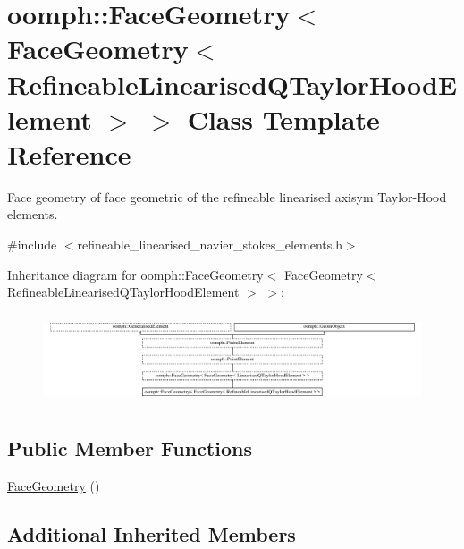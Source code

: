 \hypertarget{classoomph_1_1FaceGeometry_3_01FaceGeometry_3_01RefineableLinearisedQTaylorHoodElement_01_4_01_4}{}\section{oomph\+:\+:Face\+Geometry$<$ Face\+Geometry$<$ Refineable\+Linearised\+Q\+Taylor\+Hood\+Element $>$ $>$ Class Template Reference}
\label{classoomph_1_1FaceGeometry_3_01FaceGeometry_3_01RefineableLinearisedQTaylorHoodElement_01_4_01_4}


Face geometry of face geometric of the refineable linearised axisym Taylor-\/\+Hood elements.  




{\ttfamily \#include $<$refineable\+\_\+linearised\+\_\+navier\+\_\+stokes\+\_\+elements.\+h$>$}

Inheritance diagram for oomph\+:\+:Face\+Geometry$<$ Face\+Geometry$<$ Refineable\+Linearised\+Q\+Taylor\+Hood\+Element $>$ $>$\+:\begin{figure}[H]
\begin{center}
\leavevmode
\includegraphics[height=2.713178cm]{classoomph_1_1FaceGeometry_3_01FaceGeometry_3_01RefineableLinearisedQTaylorHoodElement_01_4_01_4}
\end{center}
\end{figure}
\subsection*{Public Member Functions}
\begin{DoxyCompactItemize}
\item 
\hyperlink{classoomph_1_1FaceGeometry_3_01FaceGeometry_3_01RefineableLinearisedQTaylorHoodElement_01_4_01_4_a363c40c076cd574b7876d3acaf96d982}{Face\+Geometry} ()
\end{DoxyCompactItemize}
\subsection*{Additional Inherited Members}


